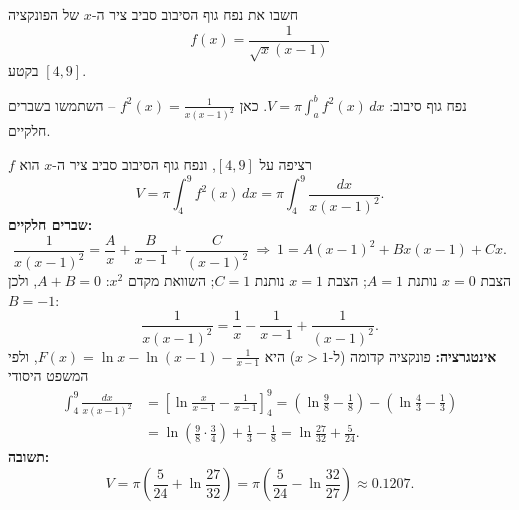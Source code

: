 
\begin{question}
חשבו את נפח גוף הסיבוב סביב ציר ה-$x$ של הפונקציה
\[ f(x)=\frac{1}{\sqrt{x}(x-1)} \]
בקטע $[4,9]$.
\end{question}

\begin{hint}
נפח גוף סיבוב: $V=\pi\int_a^b f^2(x)\,dx$. כאן $f^2(x)=\frac1{x(x-1)^2}$ -- השתמשו בשברים חלקיים.
\end{hint}

\begin{solution}
$f$ רציפה על $[4,9]$, ונפח גוף הסיבוב סביב ציר ה-$x$ הוא
\[ V=\pi\int_4^9f^2(x)\,dx=\pi\int_4^9\frac{dx}{x(x-1)^2}. \]
\textbf{שברים חלקיים:}
\[ \frac1{x(x-1)^2}=\frac Ax+\frac B{x-1}+\frac C{(x-1)^2}\ \Longrightarrow\ 1=A(x-1)^2+Bx(x-1)+Cx. \]
הצבת $x=0$ נותנת $A=1$; הצבת $x=1$ נותנת $C=1$; השוואת מקדם $x^2$: $A+B=0$, ולכן $B=-1$:
\[ \frac1{x(x-1)^2}=\frac1x-\frac1{x-1}+\frac1{(x-1)^2}. \]
\textbf{אינטגרציה:} פונקציה קדומה (ל-$x>1$) היא $F(x)=\ln x-\ln(x-1)-\frac1{x-1}$, ולפי המשפט היסודי
\begin{align*}
\int_4^9\frac{dx}{x(x-1)^2}&=\left[\ln\frac{x}{x-1}-\frac1{x-1}\right]_4^9=\left(\ln\frac98-\frac18\right)-\left(\ln\frac43-\frac13\right)\\
&=\ln\left(\frac98\cdot\frac34\right)+\frac13-\frac18=\ln\frac{27}{32}+\frac5{24}.
\end{align*}
\textbf{תשובה:}
\[ V=\pi\left(\frac5{24}+\ln\frac{27}{32}\right)=\pi\left(\frac5{24}-\ln\frac{32}{27}\right)\approx0.1207. \]
\end{solution}
